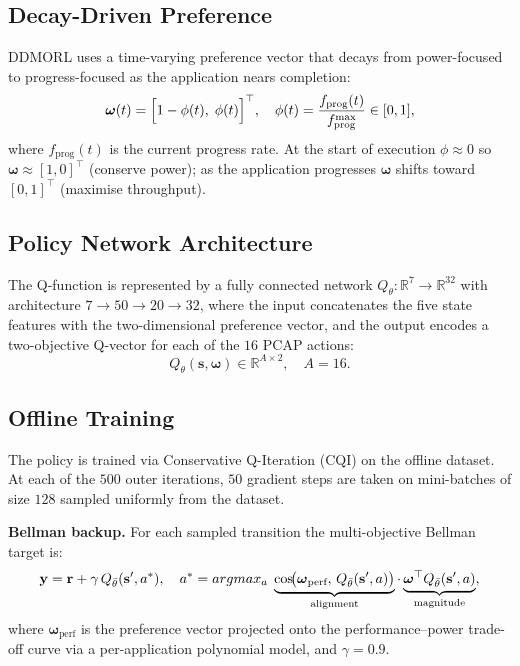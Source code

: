   \subsection{Decay-Driven Preference}
  \label{sec:preference}

  DDMORL uses a time-varying preference vector that decays from power-focused to
  progress-focused as the application nears completion:
  \begin{equation}
      \boldsymbol{\omega}(t) = \Bigl[1 - \phi(t),\; \phi(t)\Bigr]^{\top},
      \quad
      \phi(t) = \frac{f_{\text{prog}}(t)}{f_{\text{prog}}^{\max}} \in [0, 1],
      \label{eq:preference}
  \end{equation}
  where $f_{\text{prog}}(t)$ is the current progress rate. At the start of
  execution $\phi \approx 0$ so $\boldsymbol{\omega} \approx [1, 0]^{\top}$
  (conserve power); as the application progresses $\boldsymbol{\omega}$ shifts
  toward $[0, 1]^{\top}$ (maximise throughput).

  \subsection{Policy Network Architecture}
  \label{sec:network}

  The Q-function is represented by a fully connected network
  $Q_\theta : \mathbb{R}^7 \to \mathbb{R}^{32}$ with architecture
  $7 \to 50 \to 20 \to 32$, where the input concatenates the five state features
  with the two-dimensional preference vector, and the output encodes a
  two-objective Q-vector for each of the $16$ PCAP actions:
  \begin{equation}
      Q_\theta(\mathbf{s}, \boldsymbol{\omega}) \in \mathbb{R}^{A \times 2},
      \quad A = 16.
  \end{equation}

  \subsection{Offline Training}
  \label{sec:training}

  The policy is trained via Conservative Q-Iteration (CQI) on the offline dataset.
  At each of the $500$ outer iterations, $50$ gradient steps are taken on
  mini-batches of size $128$ sampled uniformly from the dataset.

  \noindent\textbf{Bellman backup.}
  For each sampled transition the multi-objective Bellman target is:
  \begin{equation}
      \mathbf{y} = \mathbf{r} + \gamma\, Q_{\bar\theta}(\mathbf{s}', a^*),
      \quad
      a^* = argmax_{a}\; \underbrace{%
          \cos\!\bigl(\boldsymbol{\omega}_{\text{perf}},\,
                       Q_{\bar\theta}(\mathbf{s}',a)\bigr)}_{\text{alignment}}
      \cdot
      \underbrace{%
          \boldsymbol{\omega}^{\top} Q_{\bar\theta}(\mathbf{s}',a)}_{\text{magnitude}},
      \label{eq:backup}
  \end{equation}
  where $\boldsymbol{\omega}_{\text{perf}}$ is the preference vector projected
  onto the performance--power trade-off curve via a per-application polynomial
  model, and $\gamma = 0.9$.

